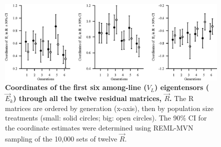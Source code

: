 \begin{figure}[!htp]
\includegraphics[width=1\textwidth]{Chp3_Multi/VLthruR_Coords.eps}
\vspace*{-0.4cm}
\caption[Coordinates of the first six among-line ($V_L$) eigentensors ($\vec{E}_k$) through all the twelve residual matrices, $\vec{R}$.]{\textbf{Coordinates of the first six among-line ($V_L$) eigentensors ($\vec{E}_k$) through all the twelve residual matrices, $\vec{R}$.} The R matrices are ordered by generation (x-axis), then by population size treatments (small: solid circles; big: open circles). The 90\% CI for the coordinate estimates were determined using REML-MVN sampling of the 10,000 sets of twelve $\vec{R}$.}
\label{fig:multi_VLthruRCoords}
\end{figure}
\FloatBarrier

